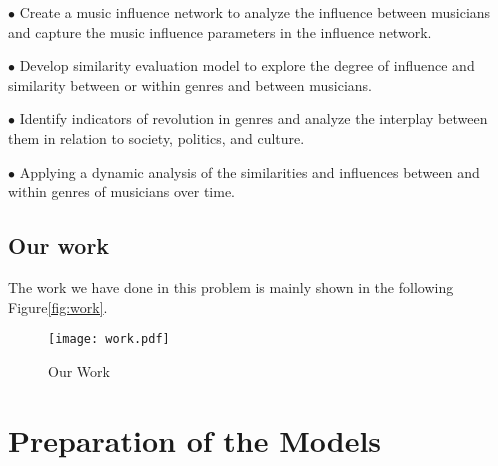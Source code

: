 \documentclass[12pt]{article}  %
\begin{document}
$\bullet$ Create a music influence network to analyze the influence between musicians and capture the music influence parameters in the influence network.

$\bullet$ Develop similarity evaluation model to explore the degree of influence and similarity between or within genres and between musicians.

$\bullet$ Identify indicators of revolution in genres and analyze the interplay between them in relation to society, politics, and culture.

$\bullet$ Applying a dynamic analysis of the similarities and influences between and within genres of musicians over time.


\vspace{-0.5cm}
\subsection{Our work}
\vspace{-0.3cm}
The work we have done in this problem is mainly shown in the following Figure\eqref{fig:work}.
\vspace{-0.3cm}
\begin{figure}[htbp]
	\centering
	\texttt{[image: work.pdf]}
	\caption{Our Work}\label{fig:work}
\end{figure}
\vspace{-0.8cm}
\section{Preparation of the Models}
\vspace{-0.5cm}
\end{document}
